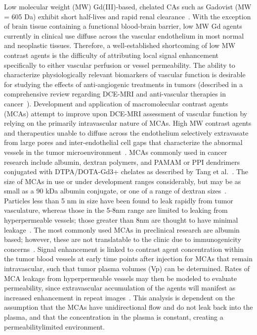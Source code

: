 Low molecular weight (MW) Gd(III)-based, chelated CAs such as Gadovist (MW = 605 Da) exhibit short half-lives and rapid renal clearance~\cite{Weinmann:1984gv}.
With the exception of brain tissue containing a functional blood-brain barrier, low MW Gd agents currently in clinical use diffuse across the vascular endothelium in most normal and neoplastic tissues.
Therefore, a well-established shortcoming of low MW contrast agents is the difficulty of attributing local signal enhancement specifically to either vascular perfusion or vessel permeability.
The ability to characterize physiologically relevant biomarkers of vascular function is desirable for studying the effects of anti-angiogenic treatments in tumors (described in a comprehensive review regarding DCE-MRI and anti-vascular therapies in cancer~\cite{OConnor:2012ie}).
Development and application of macromolecular contrast agents (MCAs) attempt to improve upon DCE-MRI assessment of vascular function by relying on the primarily intravascular nature of MCAs.
High MW contrast agents and therapeutics unable to diffuse across the endothelium selectively extravasate from large pores and inter-endothelial cell gaps that characterize the abnormal vessels in the tumor microenvironment~\cite{McDonald:2002ut,Hashizume:2000bq}.
MCAs commonly used in cancer research include albumin, dextran polymers, and PAMAM or PPI dendrimers conjugated with DTPA/DOTA-Gd3+ chelates as described by Tang et al.~\cite{Tang:2013fi}.
The size of MCAs in use or under development ranges considerably, but may be as small as a 90 kDa albumin conjugate, or one of a range of dextran sizes~\cite{Barrett:2006jx}.
Particles less than 5 nm in size have been found to leak rapidly from tumor vasculature, whereas those in the 5-8nm range are limited to leaking from hyperpermeable vessels; those greater than 8nm are thought to have minimal leakage~\cite{Kobayashi:2004vq,Sato:2001tt}.
The most commonly used MCAs in preclinical research are albumin based; however, these are not translatable to the clinic due to immunogenicity concerns~\cite{Ogan:1987tg}.
Signal enhancement is linked to contrast agent concentration within the tumor blood vessels at early time points after injection for MCAs that remain intravascular, such that tumor plasma volumes (Vp) can be determined.
Rates of MCA leakage from hyperpermeable vessels may then be modeled to evaluate permeability, since extravascular accumulation of the agents will manifest as increased enhancement in repeat images~\cite{Ogan:1987tg,Turetschek:2004bw}.
This analysis is dependent on the assumption that the MCAs have unidirectional flow and do not leak back into the plasma, and that the concentration in the plasma is constant, creating a permeabilitylimited environment.
